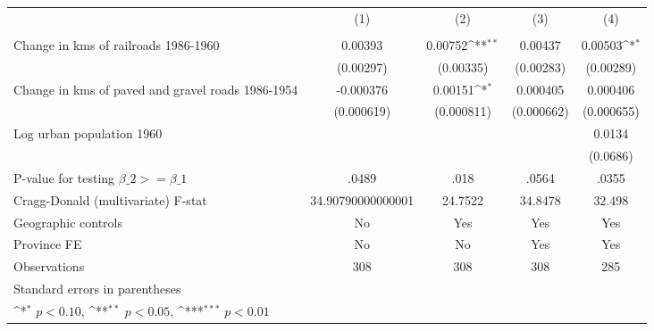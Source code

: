 {
\def\sym#1{\ifmmode^{#1}\else\(^{#1}\)\fi}
\begin{tabular}{l*{4}{c}}
\hline\hline
                &\multicolumn{1}{c}{(1)}&\multicolumn{1}{c}{(2)}&\multicolumn{1}{c}{(3)}&\multicolumn{1}{c}{(4)}\\
                &\multicolumn{1}{c}{}&\multicolumn{1}{c}{}&\multicolumn{1}{c}{}&\multicolumn{1}{c}{}\\
\hline
Change in kms of railroads 1986-1960&  0.00393         &  0.00752\sym{**} &  0.00437         &  0.00503\sym{*}  \\
                &(0.00297)         &(0.00335)         &(0.00283)         &(0.00289)         \\
[1em]
Change in kms of paved and gravel roads 1986-1954&-0.000376         &  0.00151\sym{*}  & 0.000405         & 0.000406         \\
                &(0.000619)         &(0.000811)         &(0.000662)         &(0.000655)         \\
[1em]
Log urban population 1960&                  &                  &                  &   0.0134         \\
                &                  &                  &                  & (0.0686)         \\
\hline
P-value for testing $\beta\_{2} >= \beta\_{1}$&    .0489         &     .018         &    .0564         &    .0355         \\
Cragg-Donald (multivariate) F-stat&34.90790000000001         &  24.7522         &  34.8478         &   32.498         \\
Geographic controls&       No         &      Yes         &      Yes         &      Yes         \\
Province FE     &       No         &       No         &      Yes         &      Yes         \\
Observations    &      308         &      308         &      308         &      285         \\
\hline\hline
\multicolumn{5}{l}{\footnotesize Standard errors in parentheses}\\
\multicolumn{5}{l}{\footnotesize \sym{*} \(p<0.10\), \sym{**} \(p<0.05\), \sym{***} \(p<0.01\)}\\
\end{tabular}
}
